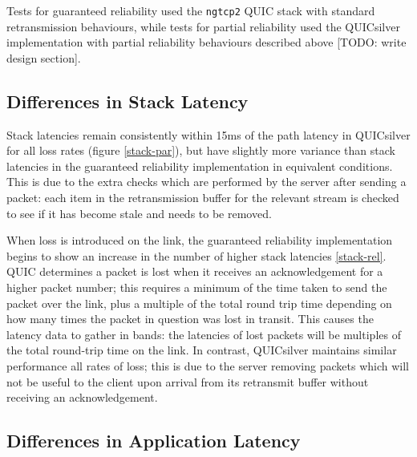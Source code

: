 \documentclass{mpaper}
\begin{document}
Tests for guaranteed reliability used the \texttt{ngtcp2} QUIC stack with standard retransmission behaviours, while tests for partial reliability used the QUICsilver implementation with partial reliability behaviours described above [TODO: write design section].

\subsection{Differences in Stack Latency}

Stack latencies remain consistently within 15ms of the path latency in QUICsilver for all loss rates (figure \ref{stack-par}), but have slightly more variance than stack latencies in the guaranteed reliability implementation in equivalent conditions. This is due to the extra checks which are performed by the server after sending a packet: each item in the retransmission buffer for the relevant stream is checked to see if it has become stale and needs to be removed.


When loss is introduced on the link, the guaranteed reliability implementation begins to show an increase in the number of higher stack latencies \ref{stack-rel}. QUIC determines a packet is lost when it receives an acknowledgement for a higher packet number; this requires a minimum of the time taken to send the packet over the link, plus a multiple of the total round trip time depending on how many times the packet in question was lost in transit. This causes the latency data to gather in bands: the latencies of lost packets will be multiples of the total round-trip time on the link. In contrast, QUICsilver maintains similar performance all rates of loss; this is due to the server removing packets which will not be useful to the client upon arrival from its retransmit buffer without receiving an acknowledgement.

\subsection{Differences in Application Latency}
\end{document}
